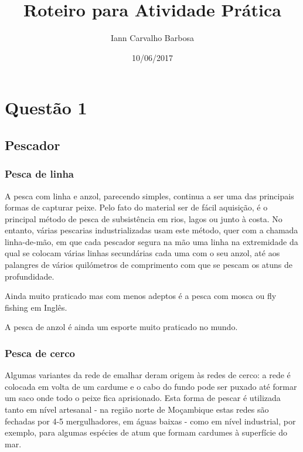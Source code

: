 \documentclass[a4paper,10pt]{article}
\title{Roteiro para Atividade Prática}
\author{Iann Carvalho Barbosa}
\date{10/06/2017}
\begin{document}
\maketitle

\tableofcontents
\newpage

\section{Questão 1}
\subsection{Pescador}
\subsubsection{Pesca de linha}
A pesca com linha e anzol, parecendo simples, continua a ser uma das principais formas de capturar peixe. Pelo fato do material ser de fácil aquisição, é o principal método de pesca de subsistência em rios, lagos ou junto à costa. No entanto, várias pescarias industrializadas usam este método, quer com a chamada linha-de-mão, em que cada pescador segura na mão uma linha na extremidade da qual se colocam várias linhas secundárias cada uma com o seu anzol, até aos palangres de vários quilómetros de comprimento com que se pescam os atuns de profundidade.

Ainda muito praticado mas com menos adeptos é a pesca com mosca ou fly fishing em Inglês.

A pesca de anzol é ainda um esporte muito praticado no mundo.

\subsubsection{Pesca de cerco}

Algumas variantes da rede de emalhar deram origem às redes de cerco: a rede é colocada em volta de um cardume e o cabo do fundo pode ser puxado até formar um saco onde todo o peixe fica aprisionado. Esta forma de pescar é utilizada tanto em nível artesanal - na região norte de Moçambique estas redes são fechadas por 4-5 mergulhadores, em águas baixas - como em nível industrial, por exemplo, para algumas espécies de atum que formam cardumes à superfície do mar.
\end{document}

